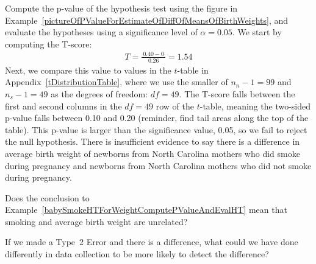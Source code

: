 \begin{examplewrap}
\begin{nexample}{Compute the p-value of the hypothesis test using the figure in Example~\ref{pictureOfPValueForEstimateOfDiffOfMeansOfBirthWeights}, and evaluate the hypotheses using a significance level of $\alpha=0.05$.} \label{babySmokeHTForWeightComputePValueAndEvalHT}
We start by computing the T-score:
\begin{align*}
T = \frac{\ 0.40 - 0\ }{0.26} = 1.54
\end{align*}
Next, we compare this value to values in the $t$-table in Appendix~\vref{tDistributionTable}, where we use the smaller of $n_n - 1 = 99$ and $n_s - 1 = 49$ as the degrees of freedom: $df = 49$. The T-score falls between the first and second columns in the $df = 49$ row of the $t$-table, meaning the two-sided p-value falls between 0.10 and 0.20 (reminder, find tail areas along the top of the table). This p-value is larger than the significance value, 0.05, so we fail to reject the null hypothesis. There is insufficient evidence to say there is a difference in average birth weight of newborns from North Carolina mothers who did smoke during pregnancy and newborns from North Carolina mothers who did not smoke during pregnancy.
\end{nexample}
\end{examplewrap}

\begin{exercisewrap}
\begin{nexercise}
Does the conclusion to Example~\ref{babySmokeHTForWeightComputePValueAndEvalHT} mean that smoking and average birth weight are unrelated?\footnotemark{}
\end{nexercise}
\end{exercisewrap}

\begin{exercisewrap}
\begin{nexercise} \label{babySmokeHTIDingHowToDetectDifferences}
If we made a Type~2 Error and there is a difference, what could we have done differently in data collection to be more likely to detect the difference?\footnotemark{}
\end{nexercise}
\end{exercisewrap}

